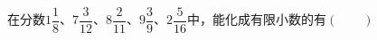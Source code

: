 在分数$1\dfrac {1}{8}$、$7\dfrac{3}{12}$、$8\dfrac{2}{11}$、$9\dfrac {3}{9}$、$2\dfrac {5}{16}$中，能化成有限小数的有\hfill$\left(\qquad\right)$
